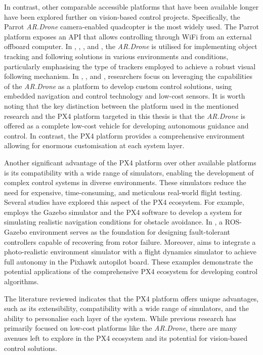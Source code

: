 In contrast, other comparable accessible platforms that have been available longer have been explored further on vision-based control projects. Specifically, the Parrot \emph{AR.Drone} camera-enabled quadcopter is the most widely used. The Parrot platform exposes an API that allows controlling through WiFi from an external offboard computer.
In \cite{bartak2015}, \cite{chakrabarty2016}, \cite{pestana2013}, and \cite{haag2015}, the \emph{AR.Drone} is utilised for implementing object tracking and following solutions in various environments and conditions, particularly emphasising the type of trackers employed to achieve a robust visual following mechanism. 
In \cite{hernandez2013}, \cite{lugo2014}, and \cite{bristeau2011}, researchers focus on leveraging the capabilities of the \emph{AR.Drone} as a platform to develop custom control solutions, using embedded navigation and control technology and low-cost sensors. It is worth noting that the key distinction between the platform used in the mentioned research and the PX4 platform targeted in this thesis is that the \emph{AR.Drone} is offered as a complete low-cost vehicle for developing autonomous guidance and control. In contrast, the PX4 platform provides a comprehensive environment allowing for enormous customisation at each system layer.

Another significant advantage of the PX4 platform over other available platforms is its compatibility with a wide range of simulators, enabling the development of complex control systems in diverse environments. These simulators reduce the need for expensive, time-consuming, and meticulous real-world flight testing. Several studies have explored this aspect of the PX4 ecosystem. 
For example, \cite{garcia2022} employs the Gazebo simulator and the PX4 software to develop a system for simulating realistic navigation conditions for obstacle avoidance.
In \cite{chen2022}, a ROS-Gazebo environment serves as the foundation for designing fault-tolerant controllers capable of recovering from rotor failure. 
Moreover, \cite{huynh2022} aims to integrate a photo-realistic environment simulator with a flight dynamics simulator to achieve full autonomy in the Pixhawk autopilot board. 
These examples demonstrate the potential applications of the comprehensive PX4 ecosystem for developing control algorithms.


The literature reviewed indicates that the PX4 platform offers unique advantages, such as its extensibility, compatibility with a wide range of simulators, and the ability to personalise each layer of the system. While previous research has primarily focused on low-cost platforms like the \emph{AR.Drone}, there are many avenues left to explore in the PX4 ecosystem and its potential for vision-based control solutions.


